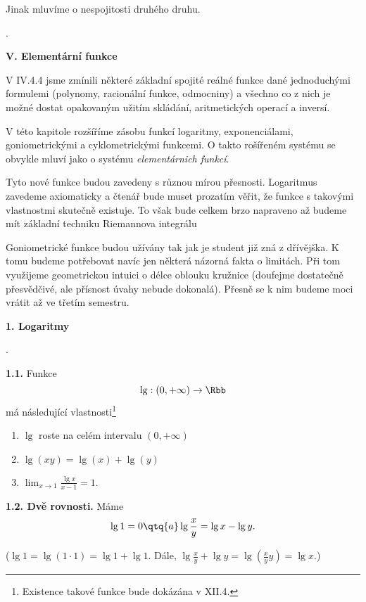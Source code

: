 \documentclass[12pt]{article}
\begin{document}
{Jinak mluvíme o nespojitosti druhého druhu.

\newpage

 .
 \newpage
 
 \centerline{\Large\bf V. Elementární funkce} 
 
 \vskip10mm
 
 
 V IV.4.4 jsme zmínili některé základní spojité reálné funkce dané jednoduchými formulemi (polynomy, racionální funkce, odmocniny) a všechno co z nich je možné dostat opakovaným užitím skládání, aritmetických operací a inversí.

V této kapitole rozšíříme zásobu funkcí logaritmy, exponenciálami, goniometrickými a cyklometrickými funkcemi. O takto rošířeném systému se obvykle mluví jako o systému 
 {\em elementárnich funkcí}.
 
  Tyto nové funkce budou zavedeny s různou mírou přesnosti. Logaritmus zavedeme axiomaticky a čtenář bude muset prozatím věřit, že funkce s takovými vlastnostmi skutečně existuje. To však bude celkem brzo napraveno až budeme mít základní techniku Riemannova integrálu

Goniometrické funkce budou užívány tak jak je student již zná z dřívějška. K tomu budeme potřebovat navíc jen některá názorná fakta o limitách. P\v ri tom využijeme geometrickou intuici o délce oblouku kružnice (doufejme dostatečně přesvědčivé, ale přísnost úvahy nebude dokonalá). Přesně se k nim budeme moci vrátit až ve třetím semestru.


 \vskip10mm
 
 {\large\bf 1. Logaritmy}
 
 \bigskip.
 
 {\bf 1.1.} Funkce
 $$
 \lg:(0,+\infty)\to \Rbb
 $$
má následující vlastnosti\footnote{Existence takové funkce bude dokázána v XII.4.} 
 \begin{enumerate}
 \item $\lg$ roste na celém intervalu $(0,+\infty)$
 \item $\lg(xy)=\lg(x)+\lg(y)$
 \item $\lim_{x\to 1}\frac{\lg x}{x-1}=1$.
 \end{enumerate}
 
 \bigskip
 
 {\bf 1.2. Dvě rovnosti.} Máme
 $$
 \lg 1=0 \qtq{a} \lg\frac{x}{y}=\lg x-\lg y.
 $$
 
 ($\lg 1=\lg(1\cdot 1)=\lg 1+\lg 1$. Dále, $\lg\frac{x}{y}+\lg y=\lg(\frac{x}{y}y)=\lg x$.)
 
 \bigskip
 
}
\end{document}
